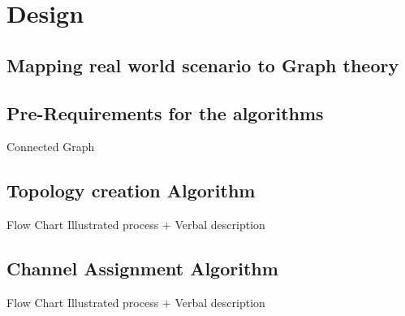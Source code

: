 \chapter{Design}
\section{Mapping real world scenario to Graph theory}
\section{Pre-Requirements for the algorithms}
Connected Graph
\section{Topology creation Algorithm}
Flow Chart
Illustrated process + Verbal description
\section{Channel Assignment Algorithm}
Flow Chart
Illustrated process + Verbal description


